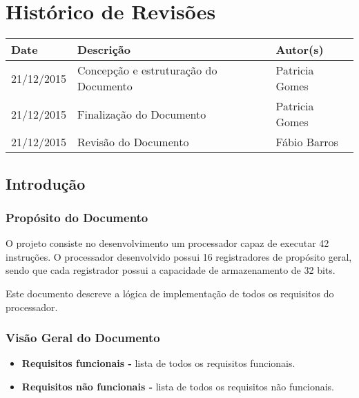 \documentclass{report}
\begin{document}

\capa
\newpage
\newpage

\chapter*{Histórico de Revisões}
  \vspace*{1cm}
  \begin{table}[ht]
    \centering
    \begin{tabular}[pos]{|m{2cm} | m{6cm} | m{3cm}|} 
      \hline
      \cellcolor[gray]{0.9}\textbf{Date} & \cellcolor[gray]{0.9}\textbf{Descrição} & \cellcolor[gray]{0.9}\textbf{Autor(s)}\\
      \hline
      21/12/2015 & Concepção e estruturação do Documento & Patricia Gomes \\ \hline      
      21/12/2015 & Finalização do Documento & Patricia Gomes \\ \hline      
      21/12/2015 & Revisão do Documento & Fábio Barros \\ \hline   
    \end{tabular}
  \end{table}

\newpage

\tableofcontents
\newpage

\section{Introdução}
 \subsection{Propósito do Documento}
  O projeto consiste no desenvolvimento um processador capaz de executar 42 instruções. O processador desenvolvido possui 16 registradores de propósito geral, sendo que cada registrador possui a capacidade de armazenamento de 32 bits.
  
  Este documento descreve a lógica de implementação de todos os requisitos do processador.

\subsection{Visão Geral do Documento}
  \begin{itemize}
   \item \textbf{Requisitos funcionais -} lista de todos os requisitos funcionais.
   \item \textbf{Requisitos não funcionais -} lista de todos os requisitos não funcionais.
  \end{itemize}
\end{document}
